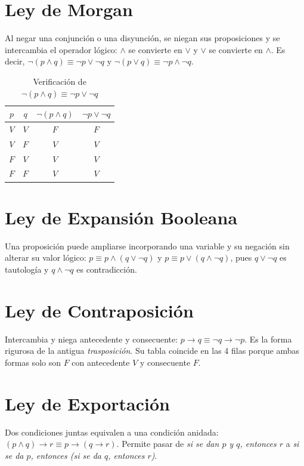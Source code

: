 \documentclass[11pt,a4paper,openany]{book}
\begin{document}
\section{Ley de Morgan}
Al negar una conjunci\'on o una disyunci\'on, se niegan sus proposiciones y se intercambia el operador l\'ogico: $\land$ se convierte en $\lor$ y $\lor$ se convierte en $\land$. Es decir, $\lnot(p \land q) \equiv \lnot p \lor \lnot q$ y $\lnot(p \lor q) \equiv \lnot p \land \lnot q$.
\begin{table}[H]
\centering
\caption{Verificaci\'on de $\lnot(p \land q) \equiv \lnot p \lor \lnot q$}
\begin{tabular}{cc|c|c}
\toprule
$p$ & $q$ & $\lnot(p \land q)$ & $\lnot p \lor \lnot q$ \\
\midrule
$V$ & $V$ & $F$ & $F$ \\
$V$ & $F$ & $V$ & $V$ \\
$F$ & $V$ & $V$ & $V$ \\
$F$ & $F$ & $V$ & $V$ \\
\bottomrule
\end{tabular}
\end{table}

\section{Ley de Expansi\'on Booleana}
Una proposici\'on puede ampliarse incorporando una variable y su negaci\'on sin alterar su valor l\'ogico: $p \equiv p \land (q \lor \lnot q)$ y $p \equiv p \lor (q \land \lnot q)$, pues $q \lor \lnot q$ es tautolog\'ia y $q \land \lnot q$ es contradicci\'on.

\section{Ley de Contraposici\'on}
Intercambia y niega antecedente y consecuente: $p \to q \equiv \lnot q \to \lnot p$. Es la forma rigurosa de la antigua \textit{trasposici\'on}. Su tabla coincide en las 4 filas porque ambas formas solo son $F$ con antecedente $V$ y consecuente $F$.

\section{Ley de Exportaci\'on}
Dos condiciones juntas equivalen a una condici\'on anidada: $(p \land q) \to r \equiv p \to (q \to r)$. Permite pasar de \textit{si se dan $p$ y $q$, entonces $r$} a \textit{si se da $p$, entonces (si se da $q$, entonces $r$)}.
\end{document}
